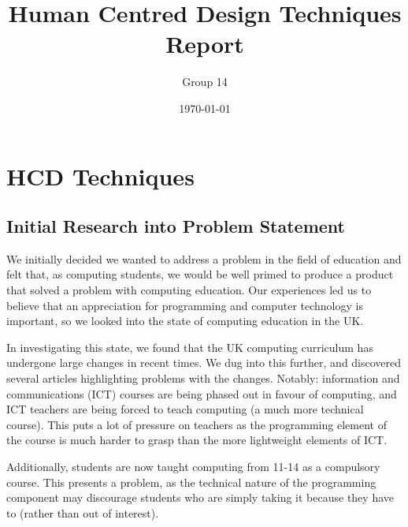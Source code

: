 \documentclass[a4wide, 11pt]{article}
\begin{document}
\title{Human Centred Design Techniques Report}

\author{Group 14}

\date{\today}         %

\maketitle            %


\section{HCD Techniques}

\subsection{Initial Research into Problem Statement} 

We initially decided we wanted to address a problem in the field of education and felt that, as computing students, we would be well primed to produce a product that solved a problem with computing education. Our experiences led us to believe that an appreciation for programming and computer technology is important, so we looked into the state of computing education in the UK.

In investigating this state, we found that the UK computing curriculum has undergone large changes in recent times. We dug into this further, and discovered several articles highlighting problems with the changes. Notably: information and communications (ICT) courses are being phased out in favour of computing, and ICT teachers are being forced to teach computing (a much more technical course). This puts a lot of pressure on teachers as the programming element of the course is much harder to grasp than the more lightweight elements of ICT.

Additionally, students are now taught computing from 11-14 as a compulsory course. This presents a problem, as the technical nature of the programming component may discourage students who are simply taking it because they have to (rather than out of interest).
\end{document}
